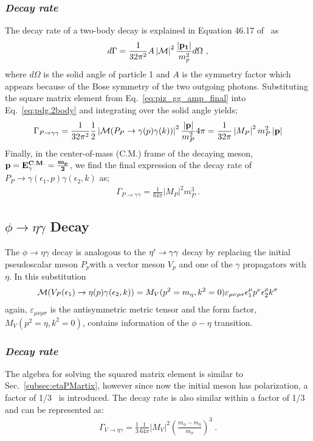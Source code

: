 \subsubsection{\emph{Decay rate}}
The decay rate of a two-body decay is explained in Equation 46.17 of~\cite{pdg2014} as
\begin{align}\label{eq:pdg.2body}
d\Gamma = \frac{1}{32 \pi^2} A \left|{\cal M}\right|^2\frac{\left|\bf{p_1}\right|}{m_p^2}d\Omega \ ,
\end{align}
where $d\Omega$ is the solid angle of particle 1 and $A$ is the symmetry factor which appears because of the Bose symmetry of the two
outgoing photons. Substituting the square matrix element from Eq.~\ref{eq:piz_gg_amp_final} into Eq.~\ref{eq:pdg.2body} and integrating over the solid angle yields;
\begin{align}
\Gamma_{P\rightarrow\gamma\gamma} = \frac{1}{32\pi^{2}} \frac{1}{2} \left|{\cal M}(P_{P}\to\gamma(p)\gamma(k))\right|^{2} \frac{\left|\bf{p}\right|}{m_{P}^2} 4 \pi = \frac{1}{32 \pi}\left|M_{P}\right|^{2}m_{P}^{2}\left|\bf{p}\right|
\end{align} 
Finally, in the center-of-mass (C.M.) frame of the decaying meson, $\bf{p} = E_{\gamma}^{C.M.} = \frac{m_p}{2}$, we find the final expression of the decay rate of $P_P \to \gamma(\epsilon_1,p) \gamma(\epsilon_2,k)$ as;
\begin{align}\label{eq:piz.gg.decay.final}
\Gamma_{P\rightarrow\gamma\gamma} = \frac{1}{64\pi} \left|M_{P}\right|^{2}m_{P}^{3} \ .
\end{align}
\subsection{$\phi \to \eta \gamma$ Decay}\label{sec:phi.etag}
The $\phi \rightarrow \eta \gamma $ decay is analogous to the $\eta^{\prime} \rightarrow \gamma \gamma$ decay by replacing the initial pseudoscalar meson $P_p$with a vector meson $V_p$ and one of the $\gamma$ propagators with $\eta$. In this substitution 
\begin{align}\label{eq:phi.etag.amp}
{\cal M}(V_P(\epsilon_1) \to \eta(p) \gamma(\epsilon_2,k)) = {M}_V(p^2=m_{\eta},k^2=0) \varepsilon_{\mu\nu\rho\sigma}\epsilon_1^\mu p^\nu \epsilon_2^\rho k^\sigma
\end{align}
again, $\varepsilon_{\mu\nu\rho\sigma}$ is the antisymmetric metric tensor and the form factor, ${M}_V(p^2=\eta,k^2=0)$, contains information of the $\phi-\eta$ transition.

\subsubsection{\emph{Decay rate}}
The algebra for solving the squared matrix element is similar to Sec.~\ref{subsec:etaPMartix}, however since now the initial meson has polarization, a factor of 1/3~\cite{Hanhart2015} is introduced. The decay rate is also similar within a factor of 1/3 and can be represented as:
\begin{align}\label{eq:phi.etag.decay.final}
\Gamma_{V\rightarrow\eta\gamma} = \frac{1}{3} \frac{1}{64\pi} \left|M_{V}\right|^{2}\left(\frac{m_{\phi} - m_{\eta}}{m_{\phi}} \right)^{3} \ .
\end{align}

%

